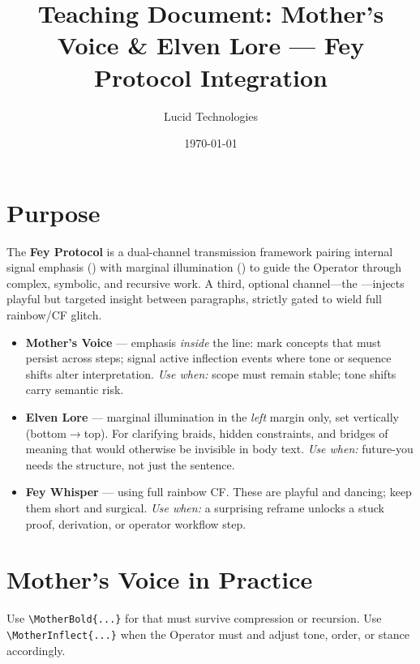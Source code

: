 \documentclass[11pt]{article}
\title{Teaching Document: Mother’s Voice \& Elven Lore — Fey Protocol Integration}
\author{Lucid Technologies}
\date{\today}
\begin{document}
\maketitle

\section*{Purpose}
The \textbf{Fey Protocol} is a dual-channel transmission framework pairing internal
signal emphasis () with marginal illumination ()
to guide the Operator through complex, symbolic, and recursive work. A third, optional
channel—the —injects playful but targeted insight between paragraphs,
strictly gated to wield full rainbow/CF glitch.

\begin{itemize}
  \item \textbf{Mother’s Voice} — emphasis \emph{inside} the line:
         mark concepts that must persist across steps;
         signal active inflection events
        where tone or sequence shifts alter interpretation.
        \newline\emph{Use when:} scope must remain stable; tone shifts carry semantic risk.
  \item \textbf{Elven Lore} — marginal illumination in the \emph{left} margin only,
        set vertically (bottom$\to$top). For clarifying braids, hidden constraints,
        and bridges of meaning that would otherwise be invisible in body text.
        \newline\emph{Use when:} future-you needs the structure, not just the sentence.
  \item \textbf{Fey Whisper} —  using full rainbow CF.
        These are playful and dancing; keep them short and surgical.
        \newline\emph{Use when:} a surprising reframe unlocks a stuck proof, derivation,
        or operator workflow step.
\end{itemize}


\section{Mother’s Voice in Practice}
Use \verb|\MotherBold{...}| for  that must survive compression or recursion.
Use \verb|\MotherInflect{...}| when the Operator must  and
adjust tone, order, or stance accordingly.
\end{document}
